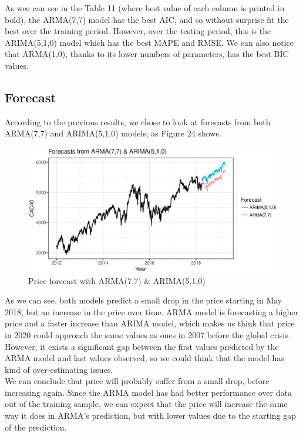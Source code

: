 As wee can see in the Table 11 (where best value of each column is printed in bold), the ARMA(7,7) model has the best AIC, and so without surprise fit the best over the training period. However, over the testing period, this is the ARIMA(5,1,0) model which has the best MAPE and RMSE. We can also notice that ARMA(1,0), thanks to its lower numbers of parameters, has the best BIC values.



\subsection{Forecast}

According to the previous results, we chose  to look at forecasts from both ARMA(7,7) and ARIMA(5,1,0) models, as Figure 24 shows. \\

\FloatBarrier
\begin{figure}[!htbp]
  \centering
      \includegraphics[width=\textwidth]{img/FC.eps}
  \caption{Price forecast with ARMA(7,7) \& ARIMA(5,1,0)}
\end{figure}
\FloatBarrier

As we can see, both models predict a small drop in the price starting in May 2018, but an increase in the price over time. ARMA model is forecasting a higher price and a faster increase than ARIMA model, which makes us think that price in 2020 could approach the same values as ones in 2007 before the global crisis. However, it exists a significant gap between the first values predicted by the ARMA model and last values observed, so we could think that the model has kind of over-estimating issues.  
\\
We can conclude that price will probably suffer from a small drop, before increasing again. Since the ARMA model has had better performance over data out of the training sample, we can expect that the price will increase the same way it does in ARMA's prediction, but with lower values due to the starting gap of the prediction.

